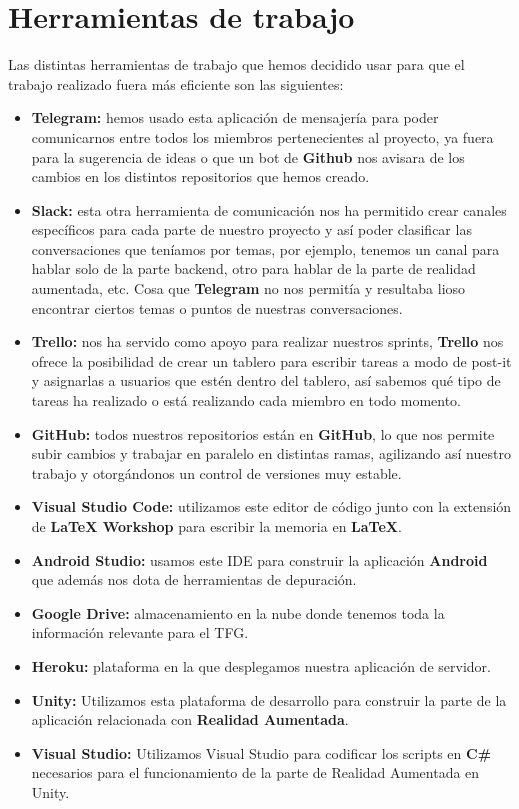 \section{Herramientas de trabajo}
\label{makereference4.5}
Las distintas herramientas de trabajo que hemos decidido usar para que el trabajo realizado fuera más eficiente son las siguientes:
\begin{itemize}
    \item \textbf{Telegram:} hemos usado esta aplicación de mensajería para poder comunicarnos entre todos los miembros pertenecientes al proyecto, ya fuera para la sugerencia de ideas o que un bot de \textbf{Github} nos avisara de los cambios en los distintos repositorios que hemos creado. 
    \item \textbf{Slack:} esta otra herramienta de comunicación nos ha permitido crear canales específicos para cada parte de nuestro proyecto y así poder clasificar las conversaciones que teníamos por temas, por ejemplo, tenemos un canal para hablar solo de la parte backend, otro para hablar de la parte de realidad aumentada, etc. Cosa que \textbf{Telegram} no nos permitía y resultaba lioso encontrar ciertos temas o puntos de nuestras conversaciones. 
    \item \textbf{Trello:} nos ha servido como apoyo para realizar nuestros sprints, \textbf{Trello} nos ofrece la posibilidad de crear un tablero para escribir tareas a modo de post-it y asignarlas a usuarios que estén dentro del tablero, así sabemos qué tipo de tareas ha realizado o está realizando cada miembro en todo momento.
    \item \textbf{GitHub:} todos nuestros repositorios están en \textbf{GitHub}, lo que nos permite subir cambios y trabajar en paralelo en distintas ramas, agilizando así nuestro trabajo y otorgándonos un control de versiones muy estable.
    \item \textbf{Visual Studio Code:} utilizamos este editor de código junto con la extensión de \textbf{LaTeX Workshop} para escribir la memoria en \textbf{LaTeX}.
    \item \textbf{Android Studio:} usamos este IDE para construir la aplicación \textbf{Android} que además nos dota de herramientas de depuración.
    \item \textbf{Google Drive:} almacenamiento en la nube donde tenemos toda la información relevante para el TFG.
    \item \textbf{Heroku:} plataforma en la que desplegamos nuestra aplicación de servidor.
    \item \textbf{Unity:} Utilizamos esta plataforma de desarrollo para construir la parte de la aplicación relacionada con \textbf{Realidad Aumentada}.
    \item \textbf{Visual Studio:} Utilizamos Visual Studio para codificar los scripts en \textbf{C\#} necesarios para el funcionamiento de la parte de Realidad Aumentada en Unity.
\end{itemize}
